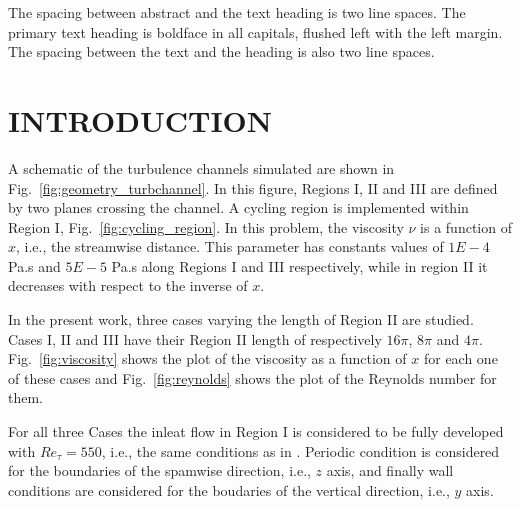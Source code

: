 \documentclass[twocolumn,10pt]{asme2e}
\begin{document}
\begin{nomenclature}

\end{nomenclature}

The spacing between abstract and the text heading is two line spaces.  The primary text heading is  boldface in all capitals, flushed left with the left margin.  The spacing between the  text and the heading is also two line spaces.

\section*{INTRODUCTION}

A schematic of the turbulence channels simulated are shown in Fig.~\ref{fig:geometry_turbchannel}. In this figure, Regions I, II and III are defined by two planes crossing the channel. A cycling region is implemented within Region I, Fig.~\ref{fig:cycling_region}.
In this problem, the viscosity \(\nu\) is a function of \(x\), i.e., the streamwise distance. This parameter has constants values of \(1E-4\) Pa.s and \(5E-5\) Pa.s along Regions I and III respectively, while in region II it decreases with respect to the inverse of \(x\).

In the present work, three cases varying the length of Region II are studied. Cases I, II and III have their Region II length of respectively \(16\pi\), \(8\pi\) and \(4\pi\). Fig.~\ref{fig:viscosity} shows the plot of the viscosity as a function of \(x\) for each one of these cases and Fig.~\ref{fig:reynolds} shows the plot of the Reynolds number for them.

For all three Cases the inleat flow in Region I is considered to be fully developed with \(Re_{\tau}=550\), i.e., the same conditions as in \cite{hoyas2008}. Periodic condition is considered for the boundaries of the spamwise direction, i.e., \(z\) axis, and finally wall conditions are considered for the boudaries of the vertical direction, i.e., \(y\) axis.
\end{document}
